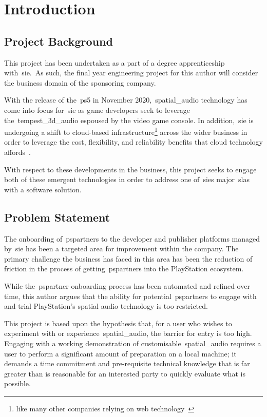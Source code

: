 \thispagestyle{plain}
\newpage
\section{Introduction}\label{sec:introduction}
\subsection{Project Background}\label{subsec:project-background}
\normalsize

This project has been undertaken as a part of a degree apprenticeship with~\gls{sie}.\
As such, the final year engineering project for this author will consider the business domain of the sponsoring company.

With the release of the~\gls{ps5} in November 2020,~\gls{spatial_audio} technology has come into focus for~\gls{sie} as game developers seek to leverage the~\gls{tempest_3d_audio} espoused by the video game console.
In addition,~\gls{sie} is undergoing a shift to cloud-based infrastructure\footnote{like many other companies relying on web technology~\citep{cc_overview}} across the wider business in order to leverage the cost, flexibility, and reliability benefits that cloud technology affords~\citep{cc_overview}.

With respect to these developments in the business, this project seeks to engage both of these emergent technologies in order to address one of~\gls{sie}\textquotesingle s major~\glspl{sla} with a software solution.

\subsection{Problem Statement}\label{subsec:problem-statement}

The onboarding of~\glspl{pspartner} to the developer and publisher platforms managed by~\gls{sie} has been a targeted area for improvement within the company.
The primary challenge the business has faced in this area has been the reduction of friction in the process of getting~\glspl{pspartner} into the PlayStation ecosystem.

While the~\gls{pspartner} onboarding process has been automated and refined over time, this author argues that the ability for potential~\glspl{pspartner} to engage with and trial PlayStation's spatial audio technology is too restricted.

This project is based upon the hypothesis that, for a user who wishes to experiment with or experience~\gls{spatial_audio}, the barrier for entry is too high.
Engaging with a working demonstration of customisable~\gls{spatial_audio} requires a user to perform a significant amount of preparation on a local machine;
it demands a time commitment and pre-requisite technical knowledge that is far greater than is reasonable for an interested party to quickly evaluate what is possible.

